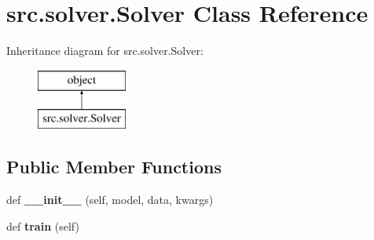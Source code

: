 \hypertarget{classsrc_1_1solver_1_1Solver}{}\section{src.\+solver.\+Solver Class Reference}
\label{classsrc_1_1solver_1_1Solver}
Inheritance diagram for src.\+solver.\+Solver\+:\begin{figure}[H]
\begin{center}
\leavevmode
\includegraphics[height=2.000000cm]{classsrc_1_1solver_1_1Solver}
\end{center}
\end{figure}
\subsection*{Public Member Functions}
\begin{DoxyCompactItemize}
\item 
\mbox{\label{classsrc_1_1solver_1_1Solver_aa4675ecd9497d24f63bc96467f8e07cd}} 
def {\bfseries \+\_\+\+\_\+init\+\_\+\+\_\+} (self, model, data, kwargs)
\item 
\mbox{\label{classsrc_1_1solver_1_1Solver_afde8803cac346c3ff7a4ac0adfa95e13}} 
def {\bfseries train} (self)
\end{DoxyCompactItemize}
